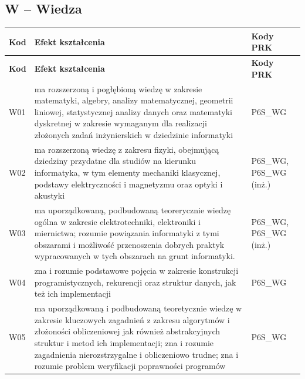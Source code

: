 \documentclass[12pt,a4paper]{article}
\newcommand{\thdrule}{\noalign{\global\setlength{\extrarowheight}{0pt}}}
\newcommand{\thdend}{\noalign{\global\setlength{\extrarowheight}{4pt}}}
\begin{document}
\subsection*{W -- Wiedza}

{\scriptsize
\begin{longtable}{m{1cm}m{9.5cm}m{3.9cm}}
\thdrule\toprule
\rowcolor{pjatkRed} {\color{white}\footnotesize\textbf{\vphantom{Ag}Kod}} & {\color{white}\footnotesize\textbf{\vphantom{Ag}Efekt kształcenia}} & {\color{white}\footnotesize\textbf{\vphantom{Ag}Kody PRK}} \\
\midrule\thdend
\endfirsthead
\thdrule\toprule
\rowcolor{pjatkRed} {\color{white}\footnotesize\textbf{\vphantom{Ag}Kod}} & {\color{white}\footnotesize\textbf{\vphantom{Ag}Efekt kształcenia}} & {\color{white}\footnotesize\textbf{\vphantom{Ag}Kody PRK}} \\
\midrule\thdend
\endhead
\rowcolor{tableRowLight} W01 & ma rozszerzoną i pogłębioną wiedzę  w zakresie matematyki, algebry, analizy matematycznej, geometrii liniowej, statystycznej analizy danych oraz matematyki dyskretnej w zakresie wymaganym dla realizacji złożonych zadań inżynierskich w dziedzinie informatyki & {\scriptsize P6S\_WG} \\
\rowcolor{tableRowAlt} W02 & ma rozszerzoną wiedzę  z zakresu fizyki, obejmującą dziedziny przydatne dla studiów na kierunku informatyka, w tym elementy mechaniki klasycznej, podstawy elektryczności i magnetyzmu oraz optyki i akustyki & {\scriptsize P6S\_WG, P6S\_WG {\scriptsize (inż.)}} \\
\rowcolor{tableRowLight} W03 & ma uporządkowaną, podbudowaną teorerycznie wiedzę ogólna w zakresie elektrotechniki, elektroniki i miernictwa; rozumie powiązania informatyki z tymi obszarami i możliwość przenoszenia dobrych praktyk wypracowanych w tych obszarach na grunt informatyki. & {\scriptsize P6S\_WG, P6S\_WG {\scriptsize (inż.)}} \\
\rowcolor{tableRowAlt} W04 & zna i rozumie podstawowe pojęcia w zakresie konstrukcji programistycznych, rekurencji oraz struktur danych, jak też ich  implementacji & {\scriptsize P6S\_WG} \\
\rowcolor{tableRowLight} W05 & ma uporządkowaną i podbudowaną teoretycznie wiedzę w zakresie kluczowych zagadnień z zakresu algorytmów i złożoności obliczeniowej jak również abstrakcyjnych struktur i metod ich implementacji; zna i rozumie zagadnienia nierozstrzygalne i obliczeniowo trudne; zna i rozumie problem weryfikacji poprawności programów & {\scriptsize P6S\_WG} \\

\end{longtable}}
\end{document}

